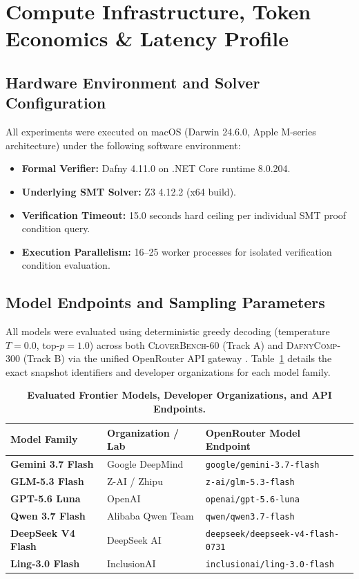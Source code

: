 \documentclass{article}
\begin{document}
\section{Compute Infrastructure, Token Economics \& Latency Profile}
\label{app:infra}

\subsection{Hardware Environment and Solver Configuration}

All experiments were executed on macOS (Darwin 24.6.0, Apple M-series architecture) under the following software environment:
\begin{itemize}
    \item \textbf{Formal Verifier:} Dafny 4.11.0 on .NET Core runtime 8.0.204.
    \item \textbf{Underlying SMT Solver:} Z3 4.12.2 (x64 build).
    \item \textbf{Verification Timeout:} 15.0 seconds hard ceiling per individual SMT proof condition query.
    \item \textbf{Execution Parallelism:} 16--25 worker processes for isolated verification condition evaluation.
\end{itemize}

\subsection{Model Endpoints and Sampling Parameters}

All models were evaluated using deterministic greedy decoding (temperature $T = 0.0$, top-$p = 1.0$) across both \textsc{CloverBench-60} (Track A) and \textsc{DafnyComp-300} (Track B) via the unified OpenRouter API gateway \citep{openrouter2026}. Table~\ref{tab:models_evaluated} details the exact snapshot identifiers and developer organizations for each model family.

\begin{table}[H]
\centering
\caption{\textbf{Evaluated Frontier Models, Developer Organizations, and API Endpoints.}}
\label{tab:models_evaluated}
\setlength{\tabcolsep}{10pt}
\begin{tabular}{lll}
\toprule
\textbf{Model Family} & \textbf{Organization / Lab} & \textbf{OpenRouter Model Endpoint} \\
\midrule
\textbf{Gemini 3.7 Flash} & Google DeepMind & \texttt{google/gemini-3.7-flash} \\
\textbf{GLM-5.3 Flash} & Z-AI / Zhipu & \texttt{z-ai/glm-5.3-flash} \\
\textbf{GPT-5.6 Luna} & OpenAI & \texttt{openai/gpt-5.6-luna} \\
\textbf{Qwen 3.7 Flash} & Alibaba Qwen Team & \texttt{qwen/qwen3.7-flash} \\
\textbf{DeepSeek V4 Flash} & DeepSeek AI & \texttt{deepseek/deepseek-v4-flash-0731} \\
\textbf{Ling-3.0 Flash} & InclusionAI & \texttt{inclusionai/ling-3.0-flash} \\
\bottomrule
\end{tabular}
\end{table}
\end{document}
